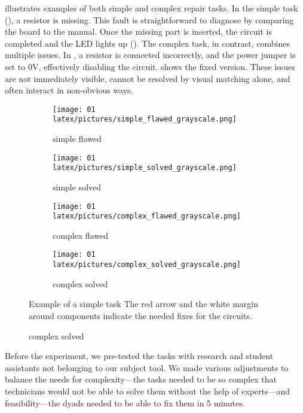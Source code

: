 \documentclass[msom,nonblindrev]{01 latex/class/informs3}
\begin{document}
 illustrates examples of both simple and complex repair tasks. In the simple task (), a resistor is missing. This fault is straightforward to diagnose by comparing the board to the manual. Once the missing part is inserted, the circuit is completed and the LED lights up (). The complex task, in contrast, combines multiple issues. In , a resistor is connected incorrectly, and the power jumper is set to 0V, effectively disabling the circuit.  shows the fixed version. These issues are not immediately visible, cannot be resolved by visual matching alone, and often interact in non-obvious ways.


\begin{figure}[htbp]
\FIGURE
{%
 \begin{subfigure}[b]{0.225\textwidth}
  \texttt{[image: 01 latex/pictures/simple\_flawed\_grayscale.png]}
      \caption{simple flawed\label{fig:simple_flawed}}
 \end{subfigure}
 \hfill
 \begin{subfigure}[b]{0.225\textwidth}
  \centering
  \texttt{[image: 01 latex/pictures/simple\_solved\_grayscale.png]}
      \caption{simple solved\label{fig:simple_solved}}
 \end{subfigure}
   \hfill
 \begin{subfigure}[b]{0.225\textwidth}
  \centering
  \texttt{[image: 01 latex/pictures/complex\_flawed\_grayscale.png]}
      \caption{complex flawed\label{fig:complex_flawed}}
 \end{subfigure}
  \hfill
 \begin{subfigure}[b]{0.225\textwidth}
  \centering
  \texttt{[image: 01 latex/pictures/complex\_solved\_grayscale.png]}
      \caption{complex solved\label{fig:complex_solved}}
 \end{subfigure}
}
{Example of a simple task\label{fig:task_example}}
{The red arrow and the white margin around components indicate the needed fixes for the circuits.}
\end{figure}

Before the experiment, we pre-tested the tasks with research and student assistants not belonging to our subject tool. We made various adjustments to balance the needs for complexity---the tasks needed to be so complex that technicians would not be able to solve them without the help of experts---and feasibility---the dyads needed to be able to fix them in 5 minutes. 
\end{document}
